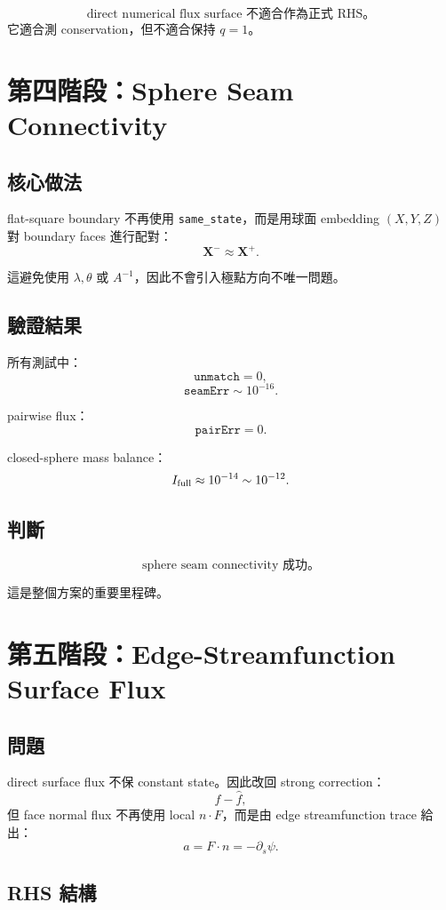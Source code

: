 \documentclass[UTF8,12pt,a4paper]{ctexart}
\begin{document}
\[
\boxed{
\text{direct numerical flux surface 不適合作為正式 RHS。}
}
\]
它適合測 conservation，但不適合保持 $q=1$。

\section{第四階段：Sphere Seam Connectivity}

\subsection{核心做法}

flat-square boundary 不再使用 \texttt{same\_state}，而是用球面 embedding $(X,Y,Z)$ 對 boundary faces 進行配對：
\[
\mathbf X^- \approx \mathbf X^+.
\]

這避免使用 $\lambda,\theta$ 或 $A^{-1}$，因此不會引入極點方向不唯一問題。

\subsection{驗證結果}

所有測試中：
\[
\texttt{unmatch}=0,
\]
\[
\texttt{seamErr}\sim10^{-16}.
\]

pairwise flux：
\[
\texttt{pairErr}=0.
\]

closed-sphere mass balance：
\[
I_{\rm full}\approx10^{-14}\sim10^{-12}.
\]

\subsection{判斷}

\[
\boxed{
\text{sphere seam connectivity 成功。}
}
\]

這是整個方案的重要里程碑。

\section{第五階段：Edge-Streamfunction Surface Flux}

\subsection{問題}

direct surface flux 不保 constant state。因此改回 strong correction：
\[
f-\hat f,
\]
但 face normal flux 不再使用 local $n\cdot F$，而是由 edge streamfunction trace 給出：
\[
a=F\cdot n=-\partial_s\psi.
\]

\subsection{RHS 結構}
\end{document}
